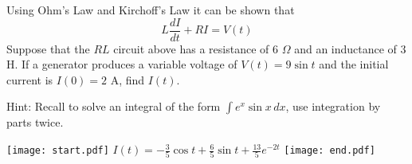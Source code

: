 \documentclass[12pt]{article}
\begin{document}
\begin{enumerate}
Using Ohm's Law and Kirchoff's Law it can be shown that $$L\frac{dI}{dt}+RI=V(t)$$  Suppose that the $RL$ circuit above has a resistance of $6$ $  \Omega$ and an inductance of $3$ H.  If a generator produces a variable voltage 
of $V(t)=9\sin{t}$ and the initial current is $I(0) = 2$ A,  find $I(t)$.

Hint: Recall to solve an integral of the form $\int e^x \sin{x} \,dx$, use integration by parts twice.

\texttt{[image: start.pdf]}
{{$I(t)=-\frac{3}{5}\cos{t}+\frac{6}{5}\sin{t}+\frac{13}{5}e^{-2t}$}}
\texttt{[image: end.pdf]}





\end{enumerate}
\end{document}
